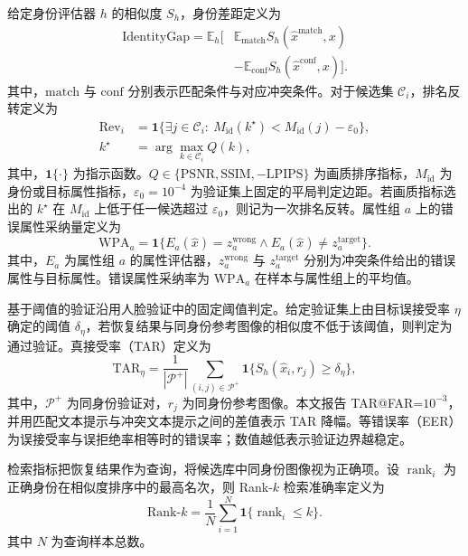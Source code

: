 \documentclass[journal]{IEEEtran}
\begin{document}
给定身份评估器 $h$ 的相似度 $S_h$，身份差距定义为
\begin{equation}
\begin{aligned}
\mathrm{IdentityGap}=\mathbb{E}_{h}\big[
&\mathbb{E}_{\mathrm{match}}S_h(\hat{x}^{\mathrm{match}},x)\\
&-\mathbb{E}_{\mathrm{conf}}S_h(\hat{x}^{\mathrm{conf}},x)
\big].
\end{aligned}
\end{equation}
其中，$\mathrm{match}$ 与 $\mathrm{conf}$ 分别表示匹配条件与对应冲突条件。对于候选集 $\mathcal{C}_i$，排名反转定义为
\begin{equation}
\begin{aligned}
\mathrm{Rev}_i
&=\mathbf{1}\{\exists j\in\mathcal{C}_i:\ M_{\mathrm{id}}(k^\star)<M_{\mathrm{id}}(j)-\varepsilon_0\},\\
k^\star
&=\arg\max_{k\in\mathcal{C}_i}Q(k),
\end{aligned}
\end{equation}
其中，$\mathbf{1}\{\cdot\}$ 为指示函数。$Q\in\{\mathrm{PSNR},\mathrm{SSIM},-\mathrm{LPIPS}\}$ 为画质排序指标，$M_{\mathrm{id}}$ 为身份或目标属性指标，$\varepsilon_0=10^{-4}$ 为验证集上固定的平局判定边距。若画质指标选出的 $k^\star$ 在 $M_{\mathrm{id}}$ 上低于任一候选超过 $\varepsilon_0$，则记为一次排名反转。属性组 $a$ 上的错误属性采纳量定义为
\begin{equation}
\mathrm{WPA}_a=\mathbf{1}\{E_a(\hat{x})=z_a^{\mathrm{wrong}}\land E_a(\hat{x})\ne z_a^{\mathrm{target}}\}.
\end{equation}
其中，$E_a$ 为属性组 $a$ 的属性评估器，$z_a^{\mathrm{wrong}}$ 与 $z_a^{\mathrm{target}}$ 分别为冲突条件给出的错误属性与目标属性。错误属性采纳率为 $\mathrm{WPA}_a$ 在样本与属性组上的平均值。

基于阈值的验证沿用人脸验证中的固定阈值判定。给定验证集上由目标误接受率 $\eta$ 确定的阈值 $\delta_{\eta}$，若恢复结果与同身份参考图像的相似度不低于该阈值，则判定为通过验证。真接受率（TAR）定义为
\begin{equation}
\mathrm{TAR}_{\eta}
=
\frac{1}{|\mathcal{P}^{+}|}
\sum_{(i,j)\in\mathcal{P}^{+}}
\mathbf{1}\{S_h(\hat{x}_i,r_j)\geq \delta_{\eta}\},
\end{equation}
其中，$\mathcal{P}^{+}$ 为同身份验证对，$r_j$ 为同身份参考图像。本文报告 TAR@FAR=$10^{-3}$，并用匹配文本提示与冲突文本提示之间的差值表示 TAR 降幅。等错误率（EER）为误接受率与误拒绝率相等时的错误率；数值越低表示验证边界越稳定。

检索指标把恢复结果作为查询，将候选库中同身份图像视为正确项。设 $\operatorname{rank}_i$ 为正确身份在相似度排序中的最高名次，则 Rank-$k$ 检索准确率定义为
\begin{equation}
\mathrm{Rank}\text{-}k
=
\frac{1}{N}
\sum_{i=1}^{N}
\mathbf{1}\{\operatorname{rank}_i\leq k\}.
\end{equation}
其中 $N$ 为查询样本总数。
\end{document}
